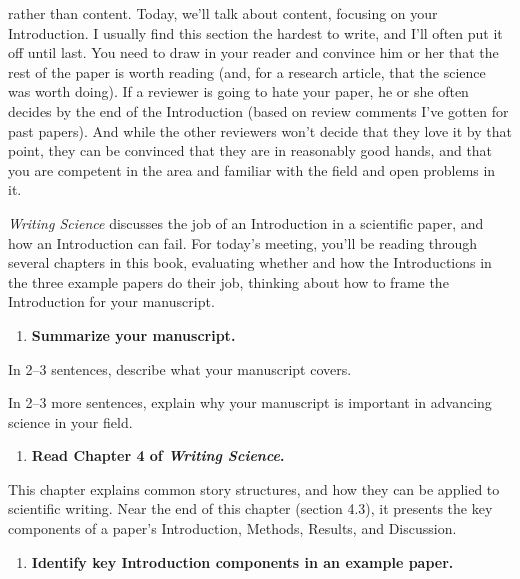 \documentclass[]{tufte-book}
\providecommand{\tightlist}{%
  \setlength{\itemsep}{0pt}\setlength{\parskip}{0pt}}
\begin{document}
 rather than content. Today,
we'll talk about content, focusing on your Introduction. I usually find this
section the hardest to write, and I'll often put it off until last. You need to
draw in your reader and convince him or her that the rest of the paper is worth
reading (and, for a research article, that the science was worth doing). If a
reviewer is going to hate your paper, he or she often decides by the end of the
Introduction (based on review comments I've gotten for past papers). And while
the other reviewers won't decide that they love it by that point, they can be
convinced that they are in reasonably good hands, and that you are competent in
the area and familiar with the field and open problems in it.

\emph{Writing Science} discusses the job of an Introduction in a scientific paper,
and how an Introduction can fail. For today's meeting, you'll be reading through
several chapters in this book, evaluating whether and how the Introductions in
the three example papers do their job, thinking about how to frame the
Introduction for your manuscript.

\begin{enumerate}
\def\labelenumi{\arabic{enumi}.}
\tightlist
\item
  \textbf{Summarize your manuscript.}
\end{enumerate}

In 2--3 sentences, describe what your manuscript covers.

In 2--3 more sentences, explain why your manuscript is important in advancing
science in your field.

\begin{enumerate}
\def\labelenumi{\arabic{enumi}.}
\setcounter{enumi}{1}
\tightlist
\item
  \textbf{Read Chapter 4 of \emph{Writing Science}.}
\end{enumerate}

This chapter explains common story structures, and how they can be applied
to scientific writing. Near the end of this chapter (section 4.3), it presents
the key components of a paper's Introduction, Methods, Results, and Discussion.

\begin{enumerate}
\def\labelenumi{\arabic{enumi}.}
\setcounter{enumi}{2}
\tightlist
\item
  \textbf{Identify key Introduction components in an example paper.}
\end{enumerate}
\end{document}
